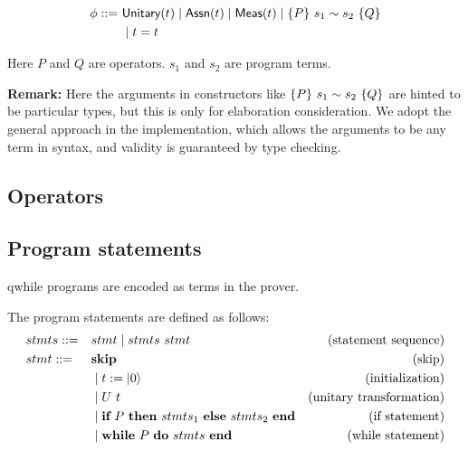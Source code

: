 \begin{definition}
    \label{def:prop syntax}
    \begin{align*}
        \phi ::=\ & \textsf{Unitary}({t}) \mid \textsf{Assn}(t) \mid \textsf{Meas}(t) \mid \{P\}~s_1 \sim s_2~\{Q\} \\
                & \mid t = t
    \end{align*}
\end{definition}
Here $P$ and $Q$ are operators. $s_1$ and $s_2$ are program terms.

\textbf{Remark:} Here the arguments in constructors like $\{P\}~s_1 \sim s_2~\{Q\}$ are hinted to be particular types, but this is only for elaboration consideration. We adopt the general approach in the implementation, which allows the arguments to be any term in syntax, and validity is guaranteed by type checking.

\subsection{Operators}

\subsection{Program statements}
qwhile programs are encoded as terms in the prover.

\newcommand{\Skip}{\textbf{skip}}
\newcommand{\Init}[1]{\ensuremath{#1:=\ket{0}}}
\newcommand{\If}[3]{\ensuremath{
    \textbf{if}\ #1\ \textbf{then}\ #2\ \textbf{else}\ #3\ \textbf{end}
}}
\newcommand{\While}[2]{\ensuremath{
    \textbf{while}\ #1\ \textbf{do}\ #2\ \textbf{end}
}}

\begin{definition}
    \label{def: prog syntax}
    The program statements are defined as follows:
    \begin{align*}
        & stmts ::= && stmt \mid stmts\ stmt & \text{(statement sequence)} \\
        & stmt ::= && \Skip & \text{(skip)} \\
            & && \mid \Init{t} & \text{(initialization)} \\
            & && \mid U\ t & \text{(unitary transformation)} \\
            & && \mid \If{P}{stmts_1}{stmts_2} & \text{(if statement)} \\
            & && \mid \While{P}{stmts} & \text{(while statement)}
    \end{align*}
\end{definition}


